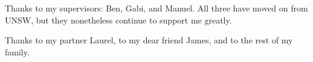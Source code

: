 Thanks to my supervisors: Ben, Gabi, and Manuel.
All three have moved on from UNSW, but they nonetheless continue to support me greatly.

Thanks to my partner Laurel, to my dear friend James, and to the rest of my family.


